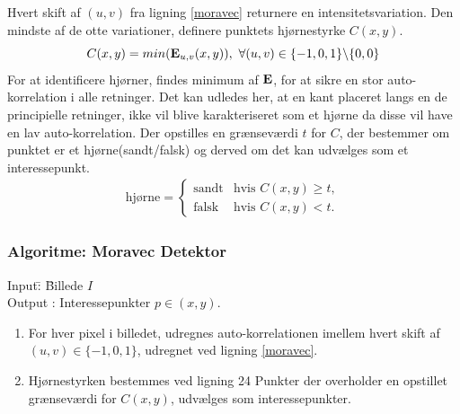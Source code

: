Hvert skift af $(u,v)$ fra ligning \eqref{moravec} returnere en intensitetsvariation. Den mindste af de otte variationer, definere punktets hjørnestyrke $C(x,y)$.
\begin{equation}
C(x,y)=min(\bold{E}_{u,v}(x,y)),\text{ }\forall (u,v) \in \lbrace-1,0,1\rbrace \backslash \lbrace0,0\rbrace
\end{equation}
For at identificere hjørner, findes minimum af $\bold{E}$, for at sikre en stor auto-korrelation i alle retninger.
Det kan udledes her, at en kant placeret langs en de principielle retninger, ikke vil blive karakteriseret som et hjørne da disse vil have  en lav auto-korrelation. Der opstilles en grænseværdi $t$ for $C$, der bestemmer om punktet er et hjørne(sandt/falsk) og derved om det kan udvælges som et interessepunkt.
\begin{equation}
\begin{split}
\text{hjørne} = 
\begin{cases}
\text{sandt}& \text{hvis } C(x,y)\geq t, \\
\text{falsk }& \text{hvis } C(x,y) < t.
\end{cases}
\end{split}
\label{cornerind}
\end{equation}
\subsubsection*{Algoritme: Moravec Detektor}
\begin{tabbing}
Input\quad \= : \= Billede $I$\\
Output \text{ } \> : \> Interessepunkter $p \in (x,y)$.
\end{tabbing}
\begin{enumerate}
\item{For hver pixel i billedet, udregnes auto-korrelationen imellem hvert skift af $(u,v) \in \lbrace-1,0,1\rbrace$, udregnet ved ligning \ref{moravec}.}
\item{Hjørnestyrken bestemmes ved ligning 24 Punkter der overholder en opstillet grænseværdi for $C(x,y)$, udvælges som interessepunkter.}
\end{enumerate}
